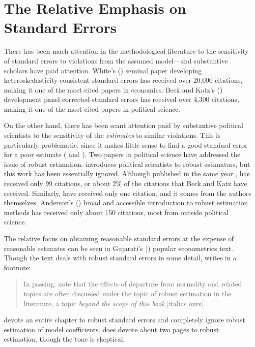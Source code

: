 \documentclass[12pt]{article}
\begin{document}
\section*{The Relative Emphasis on Standard Errors}

There has been much attention in the methodological literature to the sensitivity of standard errors to violations from the assumed model---and substantive scholars have paid attention.
White's (\citeyear{White1980}) seminal paper developing heteroskedasticity-consistent standard errors has received over 20,000 citations, making it one of the most cited papers in economics.
Beck and Katz's (\citeyear{BeckKatz1995}) development panel corrected standard errors has received over 4,300 citations, making it one of the most cited papers in political science.

On the other hand, there has been scant attention paid by substantive political scientists to the sensitivity of the \textit{estimates} to similar violations. 
This is particularly problematic, since it makes little sense to find a good standard error for a poor estimate (\citealt{Freedman2006} and \citealt{KingRoberts2014}). 
Two papers in political science have addressed the issue of robust estimation. 
\cite{Western1995} introduces political scientists to robust estimators, but this work has been essentially ignored. 
Although published in the same year \cite{BeckKatz1995}, \cite{Western1995} has received only 99 citations, or  about 2\% of the citations that Beck and Katz have received. 
Similarly, \cite{HardenDesmarais2011} have received only one citation, and it comes from the authors themselves.
Anderson's (\citeyear{Anderson2008}) broad and accessible introduction to robust estimation methods has received only about 150 citations, most from outside political science.

The relative focus on obtaining reasonable standard errors at the expense of reasonable estimates can be seen in Gujarati's (\citeyear{Gujarati2004}) popular econometrics text. Though the text deals with robust standard errors in some detail, \citet[p. 339]{Gujarati2004} writes in a footnote:
\begin{quote}
In passing, note that the effects of departure from normality and related topics are often discussed under the topic of robust estimation in the literature, a topic \textit{beyond the scope of this book} [italics ours].
\end{quote}
\cite{AngristPischke2009} devote an entire chapter to robust standard errors and completely ignore robust estimation of model coefficients. 
\cite{Wooldridge2013} does devote about two pages to robust estimation, though the tone is skeptical.
\end{document}
